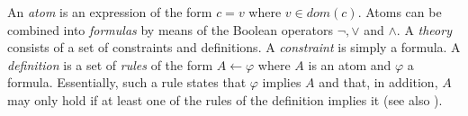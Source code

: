 An \emph{atom} is an expression of the form $c = v$ where $v \in dom(c)$.  Atoms can be combined into \emph{formulas} by means of the Boolean operators $\lnot,\lor$ and $\land$. 
A \emph{theory} consists of a set of constraints and definitions. A \emph{constraint} is simply a formula. A \emph{definition} is a set of \emph{rules} of the form $A \leftarrow \varphi$ where $A$ is an atom and $\varphi$ a formula. Essentially, such a rule states that $\varphi$ implies $A$ and that, in addition, $A$ may only hold if at least one of the rules of the definition implies it (see also \cite{KR/DeneckerV14}).




